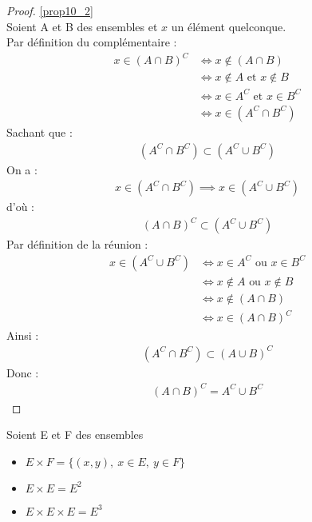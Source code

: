 \begin{proof}
	\ref{prop10_2} 
	\\
	Soient A et B des ensembles et $x$ un élément quelconque. \\
	\framebox{$\subset$} Par définition du complémentaire :
	\begin{align*}
		x \in (A \cap B)^C &\iff x \notin (A \cap B) \\ 
		&\iff x \notin A \text{ et } x \notin B \\
		&\iff x \in A^C \text{ et } x \in B^C \\
		&\iff x \in (A^C \cap B^C)
	\end{align*}
	Sachant que :
	\begin{align*}
		(A^C \cap B^C) \subset (A^C \cup B^C)
	\end{align*}
	On a :
	\begin{align*}
		x \in (A^C \cap B^C) \implies x \in (A^C \cup B^C)
	\end{align*}
	d'où :
	\begin{align*}
		(A \cap B)^C \subset (A^C \cup B^C)
	\end{align*}
	\framebox{$\supset$} Par définition de la réunion :
	\begin{align*}
		x \in (A^C \cup B^C) &\iff x \in A^C \text{ ou } x \in B^C \\
		&\iff x \notin A \text{ ou } x \notin B \\
		&\iff x \notin (A \cap B) \\
		&\iff x \in (A \cap B)^C
	\end{align*}
	Ainsi : 
	\begin{align*}
		(A^C \cap B^C) \subset (A \cup B)^C
	\end{align*}
	Donc :
	\begin{align*}
		(A \cap B)^C = A^C \cup B^C
	\end{align*}
\end{proof}

\begin{graybox}
	\begin{definition}
		Soient E et F des ensembles
		\begin{itemize}
			\item $E \times F = \{(x, y),\ x \in E,\ y \in F\} $
			\item $E \times E = E^2$
			\item $E \times E \times E = E^3$
		\end{itemize}
	\end{definition}
\end{graybox}
    
